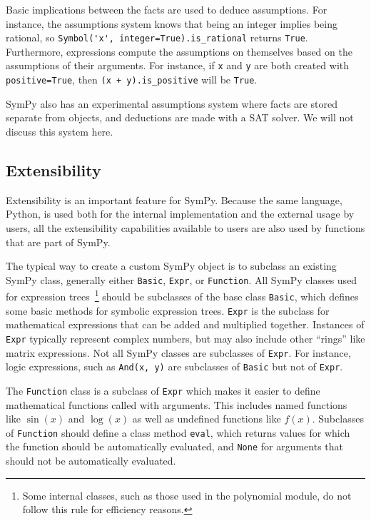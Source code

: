 Basic implications between the facts are used to deduce assumptions. For
instance, the assumptions system knows that being an integer implies being
rational, so \verb|Symbol('x', integer=True).is_rational| returns
\texttt{True}. Furthermore, expressions compute the assumptions on themselves
based on the assumptions of their arguments. For instance, if \texttt{x} and
\texttt{y} are both created with \texttt{positive=True}, then \verb|(x + y).is_positive|
will be \texttt{True}.

SymPy also has an experimental assumptions system where facts are stored
separate from objects, and deductions are made with a SAT solver. We will not
discuss this system here.

\subsection{Extensibility}

Extensibility is an important feature for SymPy. Because the same language,
Python, is used both for the internal implementation and the external usage by
users, all the extensibility capabilities available to users are also used by
functions that are part of SymPy.

The typical way to create a custom SymPy object is to subclass an existing
SymPy class, generally either \texttt{Basic}, \texttt{Expr}, or
\texttt{Function}. All SymPy classes used for expression trees~\footnote{Some
  internal classes, such as those used in the polynomial module, do not follow
  this rule for efficiency reasons.} should be subclasses of the base class
\texttt{Basic}, which defines some basic methods for symbolic expression
trees. \texttt{Expr} is the subclass for mathematical expressions that can be
added and multiplied together. Instances of \texttt{Expr} typically represent
complex numbers, but may also include other ``rings'' like matrix expressions.
Not all SymPy classes are subclasses of \texttt{Expr}. For instance, logic expressions, such
as \verb|And(x, y)| are subclasses of \texttt{Basic} but not of \texttt{Expr}.

The \texttt{Function} class is a subclass of \texttt{Expr} which makes it
easier to define mathematical functions called with arguments. This includes
named functions like $\sin(x)$ and $\log(x)$ as well as undefined functions
like $f(x)$. Subclasses of \texttt{Function} should define a
class method \texttt{eval}, which returns values for which the function should
be automatically evaluated, and \texttt{None} for arguments that should not be
automatically evaluated.

